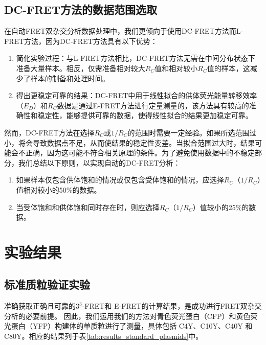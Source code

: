 \subsection{DC-FRET方法的数据范围选取}
\ifshowtext
在自动FRET双杂交分析数据处理中，我们更倾向于使用DC-FRET方法而L-FRET方法，因为DC-FRET方法具有以下优势：
\begin{enumerate}
    \item 简化实验过程：与L-FRET方法相比，DC-FRET方法无需在中间分布状态下准备大量样本。相反，仅需准备相对较大$R_C$值和相对较小$R_C$值的样本，这减少了样本的制备和处理时间。
    \item 得出更稳定可靠的结果：DC-FRET中用于线性拟合的供体荧光能量转移效率（$E_D$）和$R_C$数据是通过E-FRET方法进行定量测量的，该方法具有较高的准确性和稳定性，能够提供可靠的数据，使得线性拟合的结果更加稳定可靠。
\end{enumerate}

然而，DC-FRET方法在选择$R_C$或$1/R_C$的范围时需要一定经验。如果所选范围过小，将会导致数据点不足，从而使结果的稳定性变差。当拟合范围过大时，结果可能会不正确，因为这可能不符合相关原理的条件。为了避免使用数据中的不稳定部分，我们总结以下原则，以实现自动的DC-FRET分析：
\begin{enumerate}
    \item 如果样本仅包含供体饱和的情况或仅包含受体饱和的情况，应选择$R_C$（$1/R_C$）值相对较小的50\%的数据。
    \item 当受体饱和和供体饱和同时存在时，则应选择$R_C$（$1/R_C$）值较小的25\%的数据。
\end{enumerate}

\fi

\section{实验结果}

\subsection{标准质粒验证实验}
准确获取正确且可靠的$3^3$-FRET和 E-FRET的计算结果，是成功进行FRET双杂交分析的必要前提。
因此，我们运用我们的方法对青色荧光蛋白（CFP）和黄色荧光蛋白（YFP）构建体的单质粒进行了测量，具体包括 C4Y、C10Y、C40Y 和 C80Y。相应的结果列于表\ref{tab:results_standard_plasmids}中。

